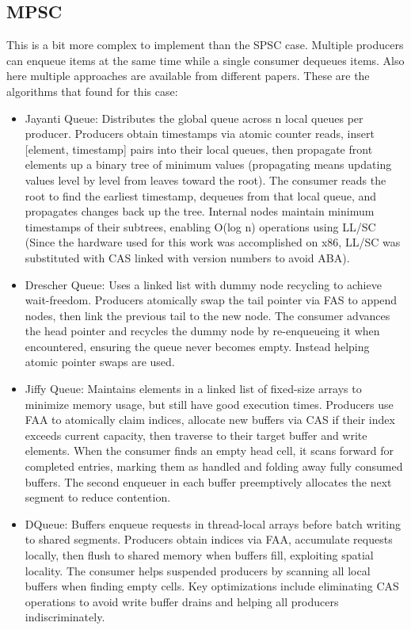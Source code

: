 \subsection{\acf{MPSC}}\label{subsec:multiple-producer-and-single-consumer}
This is a bit more complex to implement than the \ac{SPSC} case. Multiple producers can enqueue items at the same time while a single consumer dequeues items. Also here multiple approaches are available from different papers. These are the algorithms that found for this case: 
\begin{itemize}
   \item Jayanti Queue: Distributes the global queue across n local queues per producer. Producers obtain timestamps via atomic counter reads, insert [element, timestamp] pairs into their local queues, then propagate front elements up a binary tree of minimum values (propagating means updating values level by level from leaves toward the root). The consumer reads the root to find the earliest timestamp, dequeues from that local queue, and propagates changes back up the tree. Internal nodes maintain minimum timestamps of their subtrees, enabling O(log n) operations using \ac{LL/SC} (Since the hardware used for this work was accomplished on x86, \ac{LL/SC} was substituted with \ac{CAS} linked with version numbers to avoid ABA). \cite{JayantiLog}
   \item Drescher Queue: Uses a linked list with dummy node recycling to achieve wait-freedom. Producers atomically swap the tail pointer via \ac{FAS} to append nodes, then link the previous tail to the new node. The consumer advances the head pointer and recycles the dummy node by re-enqueueing it when encountered, ensuring the queue never becomes empty. Instead helping atomic pointer swaps are used. \cite{Drescher2015GuardedSections}
   \item Jiffy Queue: Maintains elements in a linked list of fixed-size arrays to minimize memory usage, but still have good execution times. Producers use \ac{FAA} to atomically claim indices, allocate new buffers via \ac{CAS} if their index exceeds current capacity, then traverse to their target buffer and write elements. When the consumer finds an empty head cell, it scans forward for completed entries, marking them as handled and folding away fully consumed buffers. The second enqueuer in each buffer preemptively allocates the next segment to reduce contention. \cite{jiffy}
   \item DQueue: Buffers enqueue requests in thread-local arrays before batch writing to shared segments. Producers obtain indices via \ac{FAA}, accumulate requests locally, then flush to shared memory when buffers fill, exploiting spatial locality. The consumer helps suspended producers by scanning all local buffers when finding empty cells. Key optimizations include eliminating \ac{CAS} operations to avoid write buffer drains and helping all producers indiscriminately. \cite{WangCacheCoherent}
\end{itemize}

